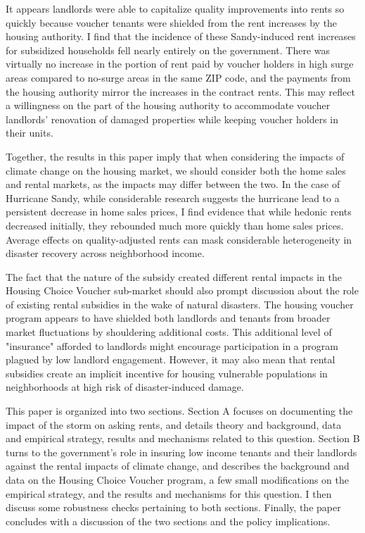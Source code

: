 \documentclass[12pt]{article}
\begin{document}
It appears landlords were able to capitalize quality improvements into rents so quickly because voucher tenants were shielded from the rent increases by the housing authority. I find that the incidence of these Sandy-induced rent increases for subsidized households fell nearly entirely on the government.  There was virtually no increase in the portion of rent paid by voucher holders in high surge areas compared to no-surge areas in the same ZIP code, and the payments from the housing authority mirror the increases in the contract rents.  This may reflect a willingness on the part of the housing authority to accommodate voucher landlords' renovation of damaged properties while keeping voucher holders in their units. 

Together, the results in this paper imply that when considering the impacts of climate change on the housing market, we should consider both the home sales and rental markets, as the impacts may differ between the two. In the case of Hurricane Sandy, while considerable research suggests the hurricane lead to a persistent decrease in home sales prices, I find evidence that while hedonic rents decreased initially, they rebounded much more quickly than home sales prices.  Average effects on quality-adjusted rents can mask considerable heterogeneity in disaster recovery across neighborhood income. 

 
The fact that the nature of the subsidy created different rental impacts in the Housing Choice Voucher sub-market should also prompt discussion about the role of existing rental subsidies in the wake of natural disasters.  The housing voucher program appears to have shielded both landlords and tenants from broader market fluctuations by shouldering additional costs. This additional level of "insurance" afforded to landlords might encourage participation in a program plagued by low landlord engagement. However, it may also mean that rental subsidies create an implicit incentive for housing vulnerable populations in neighborhoods at high risk of disaster-induced damage.

This paper is organized into two sections.  Section A focuses on documenting the impact of the storm on asking rents, and details theory and background, data and empirical strategy, results and mechanisms related to this question.  Section B turns to the government's role in insuring low income tenants and their landlords against the rental impacts of climate change, and describes the background and data on the Housing Choice Voucher program, a few small modifications on the empirical strategy, and the results and mechanisms for this question. I then discuss some robustness checks pertaining to both sections.  Finally, the paper concludes with a discussion of the two sections and the policy implications. 
\end{document}
